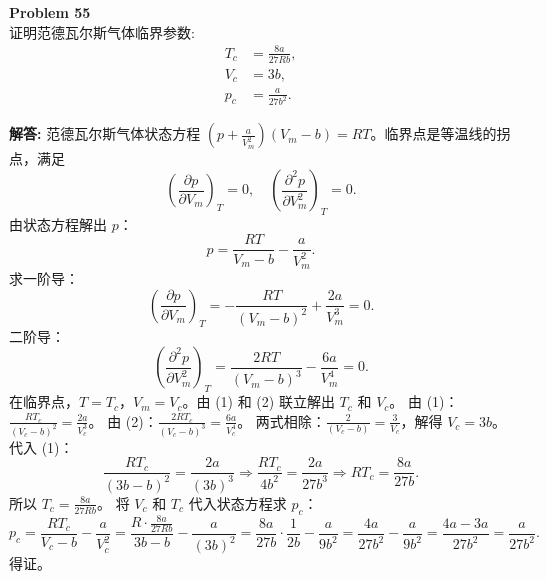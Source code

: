 \documentclass[12pt, a4paper, oneside]{ctexart}
\newenvironment{solution}{\par\noindent\textbf{解答:}\quad}{\par}
\begin{document}
\begin{mdframed}[backgroundcolor=gray!10, linewidth=0pt]
    \textbf{Problem 55} \\
    证明范德瓦尔斯气体临界参数:
    \[
    \begin{aligned}
        T_c &= \frac{8a}{27Rb}, \\
        V_c &= 3b, \\
        p_c &= \frac{a}{27b^2}.
    \end{aligned}
    \]
\end{mdframed}
\begin{solution}
    范德瓦尔斯气体状态方程 $\left(p + \frac{a}{V_m^2}\right)(V_m - b) = RT$。临界点是等温线的拐点，满足
    \[
    \left(\frac{\partial p}{\partial V_m}\right)_T = 0, \quad \left(\frac{\partial^2 p}{\partial V_m^2}\right)_T = 0.
    \]
    由状态方程解出 $p$：
    \[
    p = \frac{RT}{V_m - b} - \frac{a}{V_m^2}.
    \]
    求一阶导：
    \[
    \left(\frac{\partial p}{\partial V_m}\right)_T = -\frac{RT}{(V_m - b)^2} + \frac{2a}{V_m^3} = 0. \tag{1}
    \]
    二阶导：
    \[
    \left(\frac{\partial^2 p}{\partial V_m^2}\right)_T = \frac{2RT}{(V_m - b)^3} - \frac{6a}{V_m^4} = 0. \tag{2}
    \]
    在临界点，$T = T_c$，$V_m = V_c$。由 (1) 和 (2) 联立解出 $T_c$ 和 $V_c$。
    由 (1)：$\frac{RT_c}{(V_c - b)^2} = \frac{2a}{V_c^3}$。
    由 (2)：$\frac{2RT_c}{(V_c - b)^3} = \frac{6a}{V_c^4}$。
    两式相除：$\frac{2}{(V_c - b)} = \frac{3}{V_c}$，解得 $V_c = 3b$。
    代入 (1)：
    \[
    \frac{RT_c}{(3b - b)^2} = \frac{2a}{(3b)^3} \Rightarrow \frac{RT_c}{4b^2} = \frac{2a}{27b^3} \Rightarrow RT_c = \frac{8a}{27b}.
    \]
    所以 $T_c = \frac{8a}{27Rb}$。
    将 $V_c$ 和 $T_c$ 代入状态方程求 $p_c$：
    \[
    p_c = \frac{RT_c}{V_c - b} - \frac{a}{V_c^2} = \frac{R \cdot \frac{8a}{27Rb}}{3b - b} - \frac{a}{(3b)^2} = \frac{8a}{27b} \cdot \frac{1}{2b} - \frac{a}{9b^2} = \frac{4a}{27b^2} - \frac{a}{9b^2} = \frac{4a - 3a}{27b^2} = \frac{a}{27b^2}.
    \]
    得证。
\end{solution}
\end{document}
